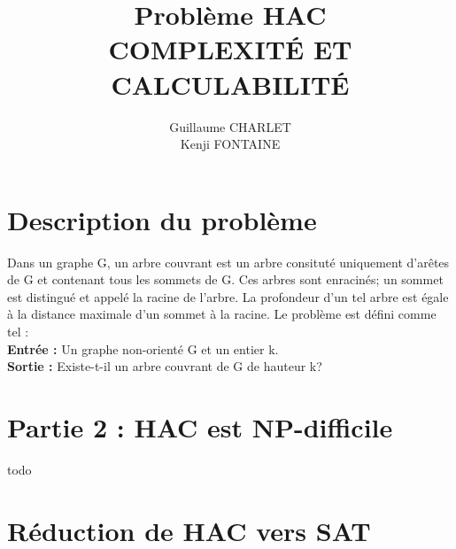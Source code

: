 \documentclass[a4paper]{article}
\title
{
	\LARGE{Problème HAC}
	\HRule \\ [0.5cm]
	\LARGE \textbf{\uppercase{Complexité et Calculabilité}}
	\HRule \\ [0.5cm]
}
\author{Guillaume CHARLET \\ Kenji FONTAINE}
\begin{document}
\null  %
\nointerlineskip  %
\vfill
\let\snewpage \newpage
\let\newpage \relax
\maketitle
\let \newpage \snewpage
\vfill
\break %


\tableofcontents
\newpage


\section{Description du problème}
Dans un graphe G, un arbre couvrant est un arbre consituté uniquement d'arêtes de G et contenant tous les sommets de G. Ces arbres sont enracinés; un sommet est distingué et appelé la racine de l'arbre. La profondeur d'un tel arbre est égale à la distance maximale d'un sommet à la racine. Le problème est défini comme tel : \\
\textbf{Entrée :} Un graphe non-orienté G et un entier k. \\
\textbf{Sortie :} Existe-t-il un arbre couvrant de G de hauteur k?


\section{Partie 2 : HAC est NP-difficile}

todo


\section{Réduction de HAC vers SAT}
\end{document}
